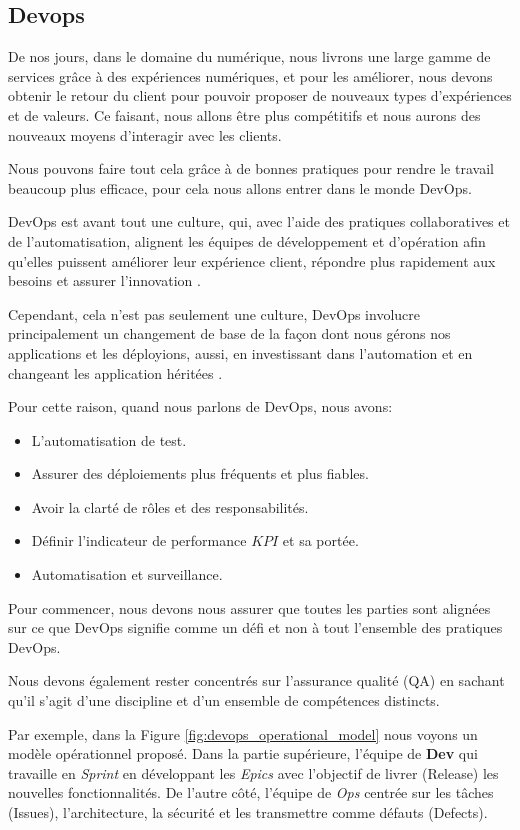 \subsection{Devops}\label{sec:devops}
De nos jours, dans le domaine du numérique, nous livrons une large gamme de services grâce à des expériences numériques, et pour les améliorer, nous devons obtenir le retour du client pour pouvoir proposer de nouveaux types d’expériences et de valeurs. Ce faisant, nous allons être plus compétitifs et nous aurons des nouveaux moyens d'interagir avec les clients.

Nous pouvons faire tout cela grâce à de bonnes pratiques pour rendre le travail beaucoup plus efficace, pour cela nous allons entrer dans le monde DevOps.

DevOps est avant tout une culture, qui, avec l'aide des pratiques collaboratives et de l'automatisation, alignent les équipes de développement et d'opération afin qu'elles puissent améliorer leur expérience client, répondre plus rapidement aux besoins et assurer l'innovation \cite{IsaacSacolick2016DrivingCulture}.

Cependant, cela n'est pas seulement une culture, DevOps involucre principalement un changement de base de la façon dont nous gérons nos applications et les déployions, aussi, en investissant dans l'automation et en changeant les application héritées \cite{benjamin_wootton}.

Pour cette raison, quand nous parlons de DevOps, nous avons:

\begin{itemize}
\item L'automatisation de test.
\item Assurer des déploiements plus fréquents et plus fiables.
\item Avoir la clarté de rôles et des responsabilités.
\item Définir l'indicateur de performance \(KPI\) et sa portée.
\item Automatisation et surveillance.
\end{itemize}

Pour commencer, nous devons nous assurer que toutes les parties sont alignées sur ce que DevOps signifie comme un défi et non à tout l’ensemble des pratiques DevOps.

Nous devons également rester concentrés sur l’assurance qualité (QA) en sachant qu’il s’agit d’une discipline et d’un ensemble de compétences distincts.

Par exemple, dans la Figure \ref{fig:devops_operational_model} nous voyons un modèle opérationnel proposé. Dans la partie supérieure, l'équipe de \textbf{Dev} qui travaille en \textit{Sprint} en développant les \textit{Epics} avec l'objectif de livrer (Release) les nouvelles fonctionnalités. De l'autre côté, l'équipe de \textit{Ops} centrée sur les tâches (Issues), l'architecture, la sécurité et les transmettre comme défauts (Defects).



